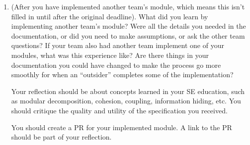 \documentclass[12pt, titlepage]{article}
\begin{document}
\begin{enumerate}
  We ultimately chose a middle ground, where modules are organized around distinct responsibilities and,
  more importantly, the design decisions and implementation details that are likely to change independently.
  This follows the principle of information hiding and gives us a reasonable balance between cohesion, coupling,
  and maintainability.

  For example, keeping the Approval Workflow separate from Projects allows us to change how approvals are handled,
  such as switching between in-platform and external GitLab-based approvals, without having to redesign the
  entire project management functionality. Similarly, separating Persistence from the business logic
  allows us to change the underlying storage implementation without requiring every module to know how data is stored.

  Overall, we chose this design because it provides a good balance between modularity and simplicity while
  making the system easier to extend and maintain as requirements evolve.

  \item (After you have implemented another team's module, which means this
  isn't filled in until after the original deadline). What did you learn by
  implementing another team's module? Were all the details you needed in the
  documentation, or did you need to make assumptions, or ask the other team
  questions?  If your team also had another team implement one of your modules,
  what was this experience like?  Are there things in your documentation you
  could have changed to make the process go more smoothly for when an
  ``outsider'' completes some of the implementation?

  Your reflection should be about concepts learned in your SE education, such as modular decomposition, cohesion, coupling, information hiding, etc.  You should critique the quality and utility of the specification you received.

  You should create a PR for your implemented module.  A link to the PR should be part of your reflection.

\end{enumerate}
\end{document}
